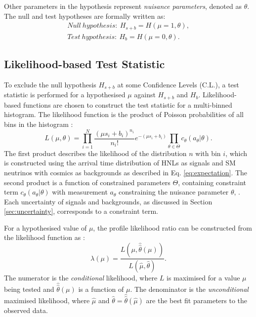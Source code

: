 Other parameters in the hypothesis represent \textit{nuisance parameters}, denoted as $\theta$.
The null and test hypotheses are formally written as:
\begin{align}
    Null\ hypothesis:\ H_{s+b} = H (\mu = 1, \theta),\\
    Test\ hypothesis:\ H_{b} = H (\mu = 0, \theta).
\end{align}

\subsection{Likelihood-based Test Statistic}
\label{sec:llh_test}

To exclude the null hypothesis $H_{s+b}$ at some Confidence Levels (C.L.), a test statistic is performed for a hypothesised $\mu$ against $H_{s+b}$ and $H_{b}$.
Likelihood-based functions are chosen to construct the test statistic for a multi-binned histogram.
The likelihood function is the product of Poisson probabilities of all bins in the histogram \cite{asymptotic_test}:
\begin{equation}
\label{eq:LLH_func}
    L(\mu, \theta) =  \prod_{i=1}^{N} \frac{(\mu s_i + b_i)^{n_i}}{n_i!} e^{-(\mu s_i + b_i)}  \prod_{\theta\in\Theta} c_\theta(a_\theta|\theta).
\end{equation}
The first product describes the likelihood of the distribution $n$ with bin $i$, which is constructed using the arrival time distribution of HNLs as signals and SM neutrinos with cosmics as backgrounds as described in Eq. \ref{eq:expectation}. 
The second product is a function of constrained parameters $\Theta$, containing constraint term $c_\theta(a_\theta|\theta)$ with measurement $a_\theta$ constraining the nuisance parameter $\theta$, 	.
Each uncertainty of signals and backgrounds, as discussed in Section \ref{sec:uncertainty}, corresponds to a constraint term. 

For a hypothesised value of $\mu$, the profile likelihood ratio can be constructed from the likelihood function as \cite{asymptotic_test}:
\begin{equation}
\label{eq:likelihood_ratio}
    \lambda(\mu) = \frac{L(\mu, \hat{\hat{\theta}}(\mu))}{L(\hat{\mu},\hat{\theta})}.
\end{equation}
The numerator is the \textit{conditional} likelihood, where $L$ is maximised for a value $\mu$ being tested and $\hat{\hat{\theta}}(\mu)$ is a function of $\mu$.
The denominator is the \textit{unconditional} maximised likelihood, where $\hat{\mu}$ and $\hat{\theta} = \hat{\hat{\theta}}(\hat{\mu})$ are the best fit parameters to the observed data.

